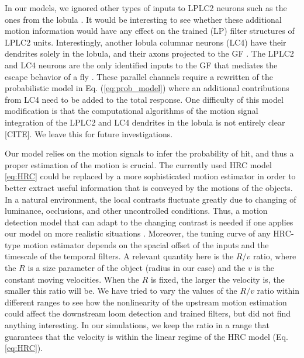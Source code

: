 \documentclass[pdftex,9pt,lineno]{elife}
\begin{document}



In our models, we ignored other types of inputs to LPLC2 neurons such as the ones from the lobula \citep{von2017feature}. It would be interesting to see whether these additional motion information would have any effect on the trained (LP) filter structures of LPLC2 units. Interestingly, another lobula columnar neurons (LC4) have their dendrites solely in the lobula, and their axons projected to the GF \citep{von2017feature}. The LPLC2 and LC4 neurons are the only identified inputs to the GF that mediates the escape behavior of a fly \citep{von2014spike, ache2019neural}. These parallel channels require a rewritten of the probabilistic model in Eq. (\ref{eq:prob_model}) where an additional contributions from LC4 need to be added to the total response. One difficulty of this model modification is that the computational algorithms of the motion signal integration of the LPLC2 and LC4 dendrites in the lobula is not entirely clear [CITE]. We leave this for future investigations.

Our model relies on the motion signals to infer the probability of hit, and thus a proper estimation of the motion is crucial. The currently used HRC model \ref{eq:HRC} could be replaced by a more sophisticated motion estimator in order to better extract useful information that is conveyed by the motions of the objects. In a natural environment, the local contrasts fluctuate greatly due to changing of luminance, occlusions, and other uncontrolled conditions. Thus, a motion detection model that can adapt to the changing contrast is needed if one applies our model on more realistic situations \citep{drews2020dynamic}. Moreover, the tuning curve of any HRC-type motion estimator depends on the spacial offset of the inputs and the timescale of the temporal filters. A relevant quantity here is the $R/v$ ratio, where the $R$ is a size parameter of the object (radius in our case) and the $v$ is the constant moving velocities. When the $R$ is fixed, the larger the velocity is, the smaller this ratio will be. We have tried to vary the values of the $R/v$ ratio within different ranges to see how the nonlinearity of the upstream motion estimation could affect the downstream loom detection and trained filters, but did not find anything interesting. In our simulations, we keep the ratio in a range that guarantees that the velocity is within the linear regime of the HRC model (Eq. \ref{eq:HRC}).
\end{document}
